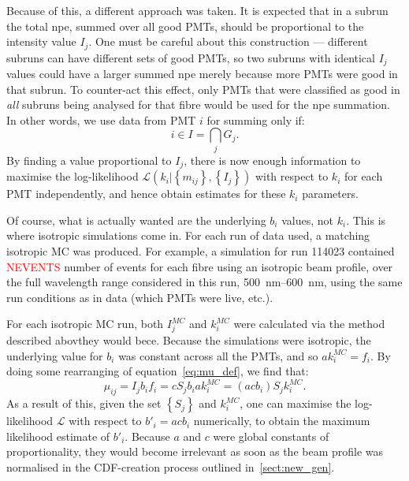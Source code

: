 Because of this, a different approach was taken. It is expected that in a subrun the total npe, summed over all good PMTs, should be proportional to the intensity value $I_{j}$. One must be careful about this construction --- different subruns can have different sets of good PMTs, so two subruns with identical $I_{j}$ values could have a larger summed npe merely because more PMTs were good in that subrun. To counter-act this effect, only PMTs that were classified as good in \textit{all} subruns being analysed for that fibre would be used for the npe summation. In other words, we use data from PMT $i$ for summing only if:
\begin{equation}
    i \in I = \bigcap_{j}G_{j}.
\end{equation}
By finding a value proportional to $I_{j}$, there is now enough information to maximise the log-likelihood $\mathcal{L}\left(k_{i} | \left\{m_{ij}\right\}, \left\{I_{j}\right\}\right)$ with respect to $k_{i}$ for each PMT independently, and hence obtain estimates for these $k_{i}$ parameters.

Of course, what is actually wanted are the underlying $b_{i}$ values, not $k_{i}$. This is where isotropic simulations come in. For each run of data used, a matching isotropic MC was produced. For example, a simulation for run \num{114023} contained \textcolor{red}{NEVENTS} number of events for each fibre using an isotropic beam profile, over the full wavelength range considered in this run, \SIrange{500}{600}{\nano\metre}, using the same run conditions as in data (which PMTs were live, etc.).

For each isotropic MC run, both $I_{j}^{MC}$ and $k_{i}^{MC}$ were calculated via the method described abovthey would bece. Because the simulations were isotropic, the underlying value for $b_{i}$ was constant across all the PMTs, and so $ak_{i}^{MC} = f_{i}$. By doing some rearranging of equation~\ref{eq:mu_def}, we find that:
\begin{equation}
    \mu_{ij} = I_{j}b_{i}f_{i} = cS_{j}b_{i}ak_{i}^{MC} = (acb_{i})S_{j}k_{i}^{MC}.
\end{equation}
As a result of this, given the set $\left\{S_{j}\right\}$ and $k_{i}^{MC}$, one can maximise the log-likelihood $\mathcal{L}$ with respect to $b'_{i} = acb_{i}$ numerically, to obtain the maximum likelihood estimate of $b'_{i}$. Because $a$ and $c$ were global constants of proportionality, they would become irrelevant as soon as the beam profile was normalised in the CDF-creation process outlined in~\ref{sect:new_gen}.

